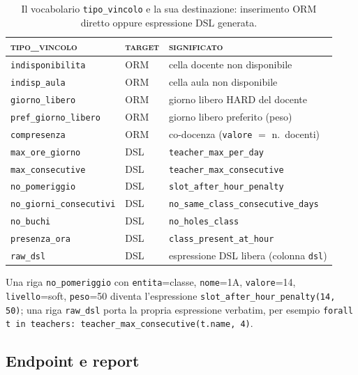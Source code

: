 \begin{table}[h]
\centering\small
\begin{tabular}{@{}lll@{}}
\toprule
\textsc{tipo\_vincolo} & \textsc{target} & \textsc{significato} \\
\midrule
\texttt{indisponibilita}        & ORM & cella docente non disponibile \\
\texttt{indisp\_aula}           & ORM & cella aula non disponibile \\
\texttt{giorno\_libero}         & ORM & giorno libero HARD del docente \\
\texttt{pref\_giorno\_libero}   & ORM & giorno libero preferito (peso) \\
\texttt{compresenza}            & ORM & co-docenza (\texttt{valore} $=$ n.\ docenti) \\
\texttt{max\_ore\_giorno}       & DSL & \texttt{teacher\_max\_per\_day} \\
\texttt{max\_consecutive}       & DSL & \texttt{teacher\_max\_consecutive} \\
\texttt{no\_pomeriggio}         & DSL & \texttt{slot\_after\_hour\_penalty} \\
\texttt{no\_giorni\_consecutivi}& DSL & \texttt{no\_same\_class\_consecutive\_days} \\
\texttt{no\_buchi}              & DSL & \texttt{no\_holes\_class} \\
\texttt{presenza\_ora}          & DSL & \texttt{class\_present\_at\_hour} \\
\texttt{raw\_dsl}               & DSL & espressione DSL libera (colonna \texttt{dsl}) \\
\bottomrule
\end{tabular}
\caption{Il vocabolario \texttt{tipo\_vincolo} e la sua destinazione:
inserimento ORM diretto oppure espressione DSL generata.}
\label{tab:vincoli-vocab}
\end{table}

\begin{esempiobox}
Una riga \texttt{no\_pomeriggio} con \texttt{entita}=classe, \texttt{nome}=1A,
\texttt{valore}=14, \texttt{livello}=soft, \texttt{peso}=50 diventa
l'espressione \texttt{slot\_after\_hour\_penalty(14, 50)}; una riga
\texttt{raw\_dsl} porta la propria espressione verbatim, per esempio
\texttt{forall t in teachers: teacher\_max\_consecutive(t.name, 4)}.
\end{esempiobox}

\subsection{Endpoint e report}

